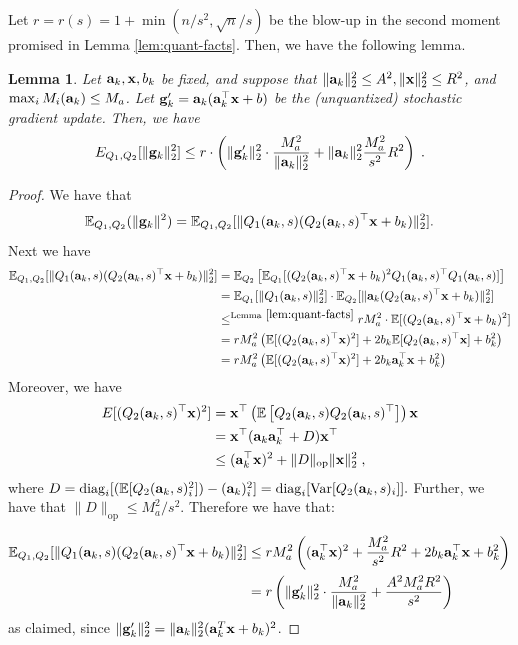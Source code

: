 \documentclass{article}
\renewcommand{\vec}[1]{\mathbf{#1}}
\def\a{{\bf a}}
\def\g{{\bf g}}
\def\x{{\bf x}}
\def\E{\mathbb{E}}
\newtheorem{lemma}{Lemma}
\begin{document}
Let $r = r(s) = 1 + \min (n / s^2, \sqrt{n}/ s)$ be the blow-up in the second moment promised in Lemma \ref{lem:quant-facts}.
Then, we have the following lemma.
\begin{lemma}
    Let $\a_k, \x, b_k$ be fixed, and suppose that $\| \a_k \|_2^2 \leq A^2, \| \x \|_2^2 \leq R^2$, and $\max_i M_i (\a_k) \leq M_a$.
    Let $\g'_k = \a_k (\a_k^\top \x + b)$ be the (unquantized) stochastic gradient update.
    Then, we have 
    \[
    E_{Q_1, Q_2} [\| \g_k \|_2^2] \leq r \cdot \left( \| \g'_k \|_2^2 \cdot \frac{M_a^2}{\| \a_k \|_2^2} + \| \a_k \|_2^2 \frac{M_a^2}{s^2} R^2 \right)\; .
    \]
\end{lemma}
\begin{proof}
We have that 
\[
\E_{Q_1, Q_2}(\|\g_k\|^2) = \E_{Q_1, Q_2} [\| Q_1 (\a_k, s) (Q_2 (\a_k, s)^\top \x + b_k) \|_2^2].
\]
Next we have
\begin{align*}
    \E_{Q_1, Q_2} [\| Q_1 (\a_k, s) (Q_2 (\a_k, s)^\top \x + b_k) \|_2^2] &= \E_{Q_2} \left[ \E_{Q_1} [ (Q_2 (\a_k, s)^\top \x + b_k)^2 Q_1 (\a_k, s)^\top Q_1 (\a_k, s)] \right] \\
    &= \E_{Q_1}[ \| Q_1( \vec{a}_k, s) \|_2^2 ] \cdot \E_{Q_2} [\| \a_k (Q_2 (\a_k, s)^\top \x + b_k)\|_2^2 ] \\
    &\leq^{\mathrm{Lemma}~\ref{lem:quant-facts}} r M_a^2 \cdot \E [(Q_2 (\a_k, s)^\top \x + b_k)^2 ] \\
    &= r M_a^2 \left( \E [(Q_2 (\a_k, s)^\top \x)^2] + 2 b_k \E [Q_2 (\a_k, s)^\top \x] + b_k^2 \right) \\
    &= r M_a^2 \left( \E [(Q_2 (\a_k, s)^\top \x)^2] + 2 b_k \a_k^\top \x + b_k^2 \right)
\end{align*}
Moreover, we have
\begin{align*}
    E [(Q_2 (\a_k, s)^\top \x)^2] &= \x^\top \left( \E \left[ Q_2 (\a_k, s) Q_2 (\a_k, s)^\top \right] \right) \x \\
    &= \x^\top (\a_k \a_k^\top + D) \x^\top \\
    &\leq (\a_k^\top \x)^2 + \| D \|_{\mathrm{op}} \| \x \|_2^2 \; ,
\end{align*}
where $D = \mathrm{diag}_i [ (\E[Q_2 (\a_k, s)_i^2]) - (\a_k)_i^2 ] =\mathrm{diag}_i [ \mathrm{Var} [Q_2 (\a_k, s)_i] ].$ Further, we have that $\| D \|_{\mathrm{op}}  \leq M_a^2 / s^2$.
Therefore we have that:

\begin{align*}
     \E_{Q_1, Q_2} [\| Q_1 (\a_k, s) (Q_2 (\a_k, s)^\top \x + b_k) \|_2^2]  &\leq r M_a^2 \left( (\a_k^\top \x)^2 + \frac{M_a^2}{s^2} R^2 + 2 b_k \a_k^\top \x + b_k^2  \right) \\
    &= r \left( \| \g'_k \|_2^2 \cdot \frac{M_a^2}{\| \a_k \|_2^2} + \frac{A^2 M_a^2 R^2}{s^2} \right) \,
\end{align*}
as claimed, since $\| \g'_k \|_2^2 = \| \a_k \|_2^2 (\a_k^T \x + b_k)^2$.
\end{proof}
\end{document}
